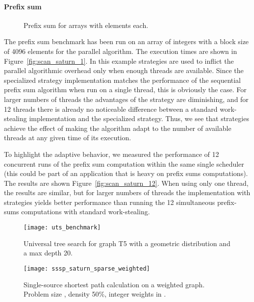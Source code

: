 \documentclass[a4paper,11pt]{article}
\begin{document}
\paragraph{Prefix sum}

\begin{figure}
\centering
{}
\caption{Prefix sum for arrays with  elements each.}
\end{figure}

The prefix sum benchmark has been run on an array of 
integers with a block size of 4096 elements for the parallel
algorithm.  The execution times are shown in
Figure~\ref{fig:scan_saturn_1}.  In this example strategies are used
to inflict the parallel algorithmic overhead only when enough threads
are available. Since the specialized strategy implementation matches
the performance of the sequential prefix sum algorithm when run on a
single thread, this is obviously the case. For larger numbers of
threads the advantages of the strategy are diminishing, and for 12
threads there is already no noticeable difference between a standard
work-stealing implementation and the specialized strategy. Thus, we
see that strategies achieve the effect of making the algorithm adapt
to the number of available threads at any given time of its execution.

To highlight the adaptive behavior, we measured the performance of 12
concurrent runs of the prefix sum computation within the same single
scheduler (this could be part of an application that is heavy on
prefix sums computations). The results are shown
Figure~\ref{fig:scan_saturn_12}. When using only one thread, the
results are similar, but for larger numbers of threads the
implementation with strategies yields better performance than running
the 12 simultaneous prefix-sums computations with standard
work-stealing.

\begin{figure}
\centering
\begin{minipage}[t]{0.45\textwidth}
\texttt{[image: uts\_benchmark]}
\caption{Universal tree search for graph T5 with a geometric distribution and a max depth 20.}
\label{fig:uts_result}
\end{minipage}
\hspace{0.05\textwidth}
\begin{minipage}[t]{0.45\textwidth}
\texttt{[image: sssp\_saturn\_sparse\_weighted]}
\caption{Single-source shortest path calculation on a weighted graph. Problem size , density 50\%, integer weights in .}
\label{fig:sssp_saturn_sparse_weighted}
\end{minipage}
\end{figure}
\end{document}
